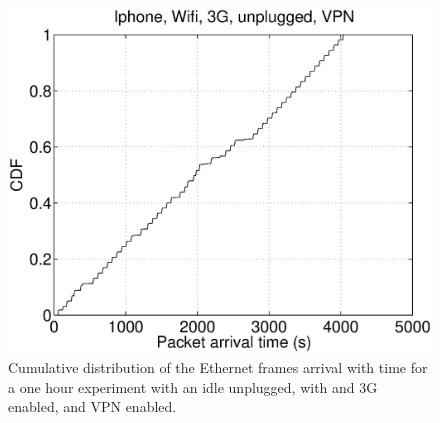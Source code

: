 \begin{figure}
\centering
        \includegraphics[width=0.8\linewidth]{../../code/pushNotification/Fig/bw_iphone_wifi_3g_unplug_vpn_ts.eps}
  \caption{Cumulative distribution of the Ethernet frames
          arrival with time for a one hour experiment with an idle
          \iphone{} unplugged, with \wifi{} and 3G enabled, and VPN
          enabled.}
  \label{fig:push_w3v_ts}
\end{figure}


